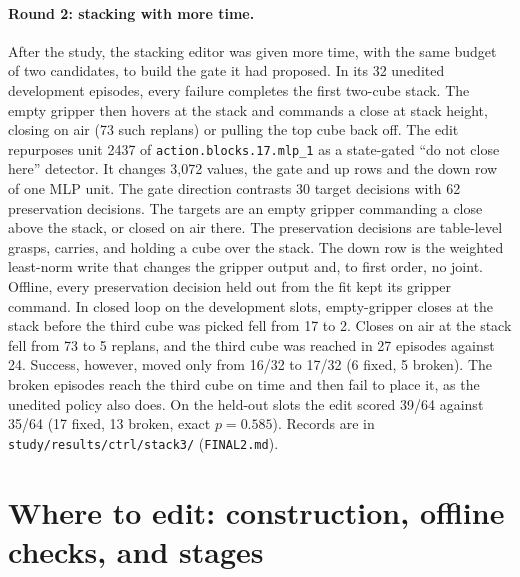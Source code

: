 \documentclass{article}
\begin{document}
\paragraph{Round 2: stacking with more time.} After the study, the stacking editor was given more time, with the same budget of two candidates, to build the gate it had proposed. In its 32 unedited development episodes, every failure completes the first two-cube stack. The empty gripper then hovers at the stack and commands a close at stack height, closing on air (73 such replans) or pulling the top cube back off. The edit repurposes unit 2437 of \texttt{action.blocks.17.mlp\_1} as a state-gated ``do not close here'' detector. It changes 3,072 values, the gate and up rows and the down row of one MLP unit. The gate direction contrasts 30 target decisions with 62 preservation decisions. The targets are an empty gripper commanding a close above the stack, or closed on air there. The preservation decisions are table-level grasps, carries, and holding a cube over the stack. The down row is the weighted least-norm write that changes the gripper output and, to first order, no joint. Offline, every preservation decision held out from the fit kept its gripper command. In closed loop on the development slots, empty-gripper closes at the stack before the third cube was picked fell from 17 to 2. Closes on air at the stack fell from 73 to 5 replans, and the third cube was reached in 27 episodes against 24. Success, however, moved only from 16/32 to 17/32 (6 fixed, 5 broken). The broken episodes reach the third cube on time and then fail to place it, as the unedited policy also does. On the held-out slots the edit scored 39/64 against 35/64 (17 fixed, 13 broken, exact $p=0.585$). Records are in \texttt{study/results/ctrl/stack3/} (\texttt{FINAL2.md}).

\FloatBarrier
\section{Where to edit: construction, offline checks, and stages}
\label{app:where}
\end{document}
